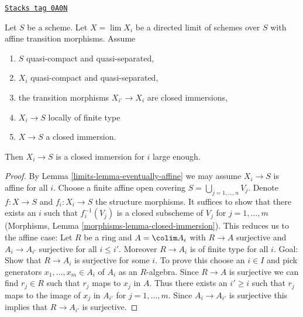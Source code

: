 \begin{lemma}
\label{limits-lemma-eventually-closed-immersion}
\href{https://stacks.math.columbia.edu/tag/0A0N}{\texttt{Stacks tag 0A0N}}

Let $S$ be a scheme. Let $X = \lim X_i$ be a directed limit of schemes
over $S$ with affine transition morphisms. Assume
\begin{enumerate}
\item $S$ quasi-compact and quasi-separated,
\item $X_i$ quasi-compact and quasi-separated,
\item the transition morphisms $X_{i'} \to X_i$ are closed immersions,
\item $X_i \to S$ locally of finite type
\item $X \to S$ a closed immersion.
\end{enumerate}
Then $X_i \to S$ is a closed immersion for $i$ large enough.
\end{lemma}

\begin{proof}

By Lemma \ref{limits-lemma-eventually-affine}
we may assume $X_i \to S$ is affine for all $i$.
Choose a finite affine open covering $S = \bigcup_{j = 1, \ldots, n} V_j$.
Denote $f : X \to S$ and $f_i : X_i \to S$ the structure morphisms.
It suffices to show that there exists an $i$ such that
$f_i^{-1}(V_j)$ is a closed subscheme of $V_j$ for $j = 1, \ldots, m$
(Morphisms, Lemma \ref{morphisms-lemma-closed-immersion}).
This reduces us to the affine case: Let $R$ be a ring and
$A = \colim A_i$ with $R \to A$ surjective and $A_i \to A_{i'}$
surjective for all $i \leq i'$. Moreover $R \to A_i$ is of finite type
for all $i$. Goal: Show that $R \to A_i$ is surjective for some $i$.
To prove this choose an $i \in I$ and pick generators
$x_1, \ldots, x_m \in A_i$ of $A_i$ as an $R$-algebra.
Since $R \to A$ is surjective we can find
$r_j \in R$ such that $r_j$ maps to $x_j$ in $A$.
Thus there exists an $i' \geq i$ such that $r_j$ maps to the image
of $x_j$ in $A_{i'}$ for $j = 1, \ldots, m$. Since $A_i \to A_{i'}$
is surjective this implies that $R \to A_{i'}$ is surjective.
\end{proof}

